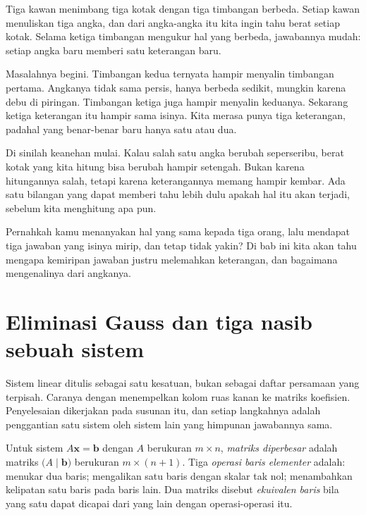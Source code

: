 \begin{untukanak}
Tiga kawan menimbang tiga kotak dengan tiga timbangan berbeda. Setiap kawan menuliskan tiga
angka, dan dari angka-angka itu kita ingin tahu berat setiap kotak. Selama ketiga timbangan
mengukur hal yang berbeda, jawabannya mudah: setiap angka baru memberi satu keterangan baru.

Masalahnya begini. Timbangan kedua ternyata hampir menyalin timbangan pertama. Angkanya
tidak sama persis, hanya berbeda sedikit, mungkin karena debu di piringan. Timbangan ketiga
juga hampir menyalin keduanya. Sekarang ketiga keterangan itu hampir sama isinya. Kita
merasa punya tiga keterangan, padahal yang benar-benar baru hanya satu atau dua.

Di sinilah keanehan mulai. Kalau salah satu angka berubah seperseribu, berat kotak yang
kita hitung bisa berubah hampir setengah. Bukan karena hitungannya salah, tetapi karena
keterangannya memang hampir kembar. Ada satu bilangan yang dapat memberi tahu lebih dulu
apakah hal itu akan terjadi, sebelum kita menghitung apa pun.

Pernahkah kamu menanyakan hal yang sama kepada tiga orang, lalu mendapat tiga jawaban yang
isinya mirip, dan tetap tidak yakin? Di bab ini kita akan tahu mengapa kemiripan jawaban
justru melemahkan keterangan, dan bagaimana mengenalinya dari angkanya.
\end{untukanak}

\section{Eliminasi Gauss dan tiga nasib sebuah sistem}

Sistem linear ditulis sebagai satu kesatuan, bukan sebagai daftar persamaan yang terpisah.
Caranya dengan menempelkan kolom ruas kanan ke matriks koefisien. Penyelesaian dikerjakan
pada susunan itu, dan setiap langkahnya adalah penggantian satu sistem oleh sistem lain yang
himpunan jawabannya sama.


\begin{definisi}
Untuk sistem $A\mathbf{x}=\mathbf{b}$ dengan $A$ berukuran $m\times n$, \emph{matriks
diperbesar} adalah matriks $\bigl(A\mid\mathbf{b}\bigr)$ berukuran $m\times(n+1)$. Tiga
\emph{operasi baris elementer} adalah: menukar dua baris; mengalikan satu baris dengan
skalar tak nol; menambahkan kelipatan satu baris pada baris lain. Dua matriks disebut
\emph{ekuivalen baris} bila yang satu dapat dicapai dari yang lain dengan operasi-operasi
itu.
\end{definisi}

